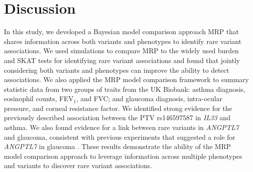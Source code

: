 



\section*{Discussion}
In this study, we developed a Bayesian model comparison approach MRP that shares information across both variants and phenotypes to identify rare variant associations. We used simulations to compare MRP to the widely used burden and SKAT tests for identifying rare variant associations and found that jointly considering both variants and phenotypes can improve the ability to detect associations. We also applied the MRP model comparison framework to summary statistic data from two groups of traits from the UK Biobank: asthma diagnosis, eosinophil counts, FEV$_1$, and FVC; and glaucoma diagnosis, intra-ocular pressure, and corneal resistance factor. We identified strong evidence for the previously described association between the PTV rs146597587 in \textit{IL33} and asthma\cite{DeBoever179762,10.1371/journal.pgen.1006659}. We also found evidence for a link between rare variants in \textit{ANGPTL7} and glaucoma, consistent with previous experiments that suggested a role for \textit{ANGPTL7} in glaucoma \cite{Comes:2011ex, Kuchtey:2008ek}. These results demonstrate the ability of the MRP model comparison approach to leverage information across multiple phenotypes and variants to discover rare variant associations.

